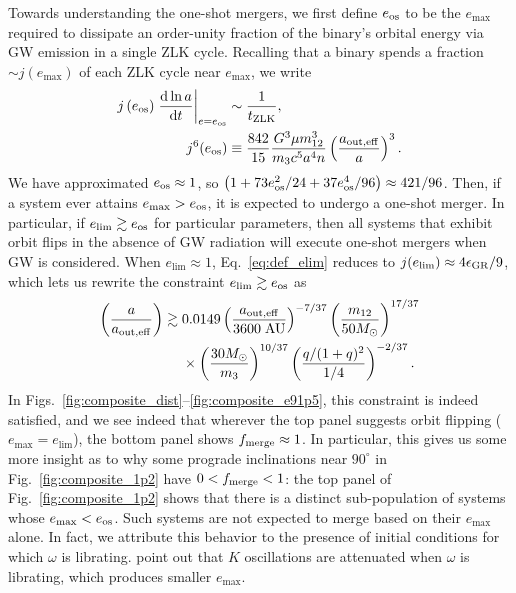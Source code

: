 \documentclass[
        fleqn,
        usenatbib,
    ]{mnras}
\newcommand*{\rd}[2]{\frac{\mathrm{d}#1}{\mathrm{d}#2}}
\newcommand*{\at}[1]{\left.#1\right|}
\newcommand*{\p}[1]{\left(#1\right)}
\begin{document}
Towards understanding the one-shot mergers, we first define $e_{\rm os}$ to be the
$e_{\max}$ required to dissipate an order-unity fraction of the binary's orbital
energy via GW emission in a single ZLK cycle. Recalling that a binary spends a
fraction $\sim j(e_{\max})$ of each ZLK cycle near $e_{\max}$, we write
\begin{align}
    j\p{e_{\rm os}}\at{\rd{\ln a}{t}}_{e = e_{\rm os}} &\sim
        \frac{1}{t_{\rm ZLK}},\\
    j^6(e_{\rm os})
        &\equiv \frac{842}{15}
            \frac{G^3 \mu m_{12}^3}{m_3c^5a^4n}
            \p{\frac{a_{\rm out, eff}}{a}}^3.
            \label{eq:def_e_os}
\end{align}
We have approximated $e_{\rm os} \approx 1$, so $\p{1 + 73e_{\rm os}^2/24 + 37
e_{\rm os}^4/96} \approx 421 / 96$. Then, if a system ever attains $e_{\max} >
e_{\rm os}$, it is expected to undergo a one-shot merger. In particular, if
$e_{\lim} \gtrsim e_{\rm os}$ for particular parameters, then all systems that
exhibit orbit flips in the absence of GW radiation will execute one-shot mergers
when GW is considered. When $e_{\lim} \approx 1$, Eq.~\eqref{eq:def_elim}
reduces to $j(e_{\lim}) \approx 4\epsilon_{\rm GR} / 9$, which lets us rewrite
the constraint $e_{\lim} \gtrsim e_{\rm os}$ as
\begin{align}
    \p{\frac{a}{a_{\rm out, eff}}} \gtrsim{}&
        0.0149
        \p{\frac{a_{\rm out, eff}}{3600\;\mathrm{AU}}}^{-7/37}
        \p{\frac{m_{12}}{50M_{\odot}}}^{17/37}\nonumber\\
        &\times\p{\frac{30M_{\odot}}{m_3}}^{10/37}
        \p{\frac{q / (1 + q)^2}{1/4}}^{-2/37}.\label{eq:q_237}
\end{align}
In Figs.~\ref{fig:composite_dist}--\ref{fig:composite_e91p5}, this constraint is
indeed satisfied, and we see indeed that wherever the top panel suggests orbit
flipping ($e_{\max} = e_{\lim}$), the bottom panel shows $f_{\rm merge} \approx
1$. In particular, this gives us some more insight as to why some prograde
inclinations near $90^\circ$ in Fig.~\ref{fig:composite_1p2} have $0 < f_{\rm
merge} < 1$: the top panel of Fig.~\ref{fig:composite_1p2} shows that there is a
distinct sub-population of systems whose $e_{\max} < e_{\rm os}$. Such systems
are not expected to merge based on their $e_{\max}$ alone. In fact, we attribute
this behavior to the presence of initial conditions for which $\omega$ is
librating. \citet{katz2011long} point out that $K$ oscillations are attenuated
when $\omega$ is librating, which produces smaller $e_{\max}$.
\end{document}
